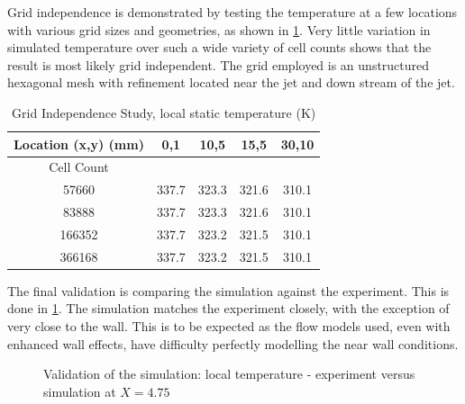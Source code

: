 \documentclass[preprint,12pt]{elsarticle}
\begin{document}
Grid independence is demonstrated by testing the temperature at a few locations with various grid sizes and geometries, as shown in \cref{tab:gridjet}.  Very little variation in simulated temperature over such a wide variety of cell counts shows that the result is most likely grid independent.  The grid employed is an unstructured hexagonal mesh with refinement located near the jet and down stream of the jet.
\begin{table}[!t!b!p]
\begin{center}
\begin{tabular}{ c c c c c }
\hline
 Location (x,y) (mm) & 0,1 & 10,5 & 15,5& 30,10 \\ \hline \hline
 Cell Count & \\ \hline
 57660  & 337.7 & 323.3 & 321.6 & 310.1 \\ \hline
 83888  & 337.7 & 323.3 & 321.6 & 310.1 \\ \hline
 166352 & 337.7 & 323.2 & 321.5 & 310.1 \\ \hline
 366168 & 337.7 & 323.2 & 321.5 & 310.1 \\ \hline
\end{tabular}
\caption{Grid Independence Study, local static temperature (K)}
\label{tab:gridjet}
\end{center}
\end{table}

%	

The final validation is comparing the simulation against the experiment.  This is done in \cref{fig:jetexp15}.  The simulation matches the experiment closely, with the exception of very close to the wall.  This is to be expected as the flow models used, even with enhanced wall effects, have difficulty perfectly modelling the near wall conditions.
\begin{figure}[!htbp]
	\centering
	\setlength\figureheight{5cm} 
	\setlength\figurewidth{5cm}
	
	\caption{Validation of the simulation: local temperature - experiment versus simulation at $X=4.75$}
	\label{fig:jetexp15}
\end{figure}
\end{document}
